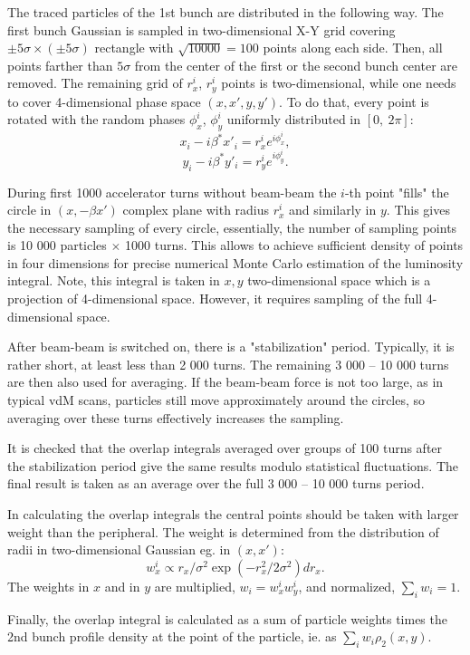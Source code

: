 \documentclass[paper=a4, fontsize=11pt]{scrartcl} %
\numberwithin{equation}{section} %
\numberwithin{figure}{section} %
\numberwithin{table}{section} %
\begin{document}
The traced particles of the 1st bunch are distributed in the following
way. The first bunch Gaussian is sampled in two-dimensional X-Y grid covering
$\pm 5\sigma \times (\pm 5\sigma)$ rectangle with $\sqrt{10 000} = 100$ points
along each side. Then, all points farther than $5\sigma$ from the center of
the first or the second bunch center are removed. The remaining grid of
$r_x^i$, $r_y^i$ points is two-dimensional, while one needs to cover
4-dimensional phase space $(x,x',y,y')$. To do that, every point is rotated
with the random phases $\phi_x^i$, $\phi_y^i$ uniformly distributed in $[0,\
2\pi]$:
\[ x_i - i\beta^* x'_i = r_x^i e^{i \phi_x^i}, \]
\[ y_i - i\beta^* y'_i = r_y^i e^{i \phi_y^i}. \]

During first 1000 accelerator turns without beam-beam the $i$-th point "fills"
the circle in $(x, -\beta x')$ complex plane with radius $r_x^i$ and similarly
in $y$. This gives the necessary sampling of every circle, essentially, the
number of sampling points is 10 000 particles $\times$ 1000 turns. This allows
to achieve sufficient density of points in four dimensions for precise
numerical Monte Carlo estimation of the luminosity integral.  Note, this
integral is taken in $x,y$ two-dimensional space which is a projection of
4-dimensional space. However, it requires sampling of the full 4-dimensional
space.

After beam-beam is switched on, there is a "stabilization" period. Typically,
it is rather short, at least less than 2 000 turns.  The remaining 3 000 -- 10
000 turns are then also used for averaging. If the beam-beam force is not too
large, as in typical vdM scans, particles still move approximately around the
circles, so averaging over these turns effectively increases the sampling.

It is checked that the overlap integrals averaged over groups of 100 turns
after the stabilization period give the same results modulo statistical
fluctuations. The final result is taken as an average over the full 3 000 --
10 000 turns period.

In calculating the overlap integrals the central points should be taken with
larger weight than the peripheral.  The weight is determined from the
distribution of radii in two-dimensional Gaussian eg. in $(x,x')$: \[ w_x^i
\propto r_x / \sigma^2 \exp(-r_x^2/2\sigma^2) dr_x. \] The weights in $x$ and
in $y$ are multiplied, $w_i = w_x^i w_y^i$, and normalized, $\sum_i w_i = 1$.

Finally, the overlap integral is calculated as a sum of particle weights times
the 2nd bunch profile density at the point of the particle, ie. as $\sum_i w_i
\rho_2(x,y)$.
\end{document}
